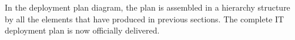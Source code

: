 In the deployment plan diagram, the plan is assembled in a hierarchy structure by all the elements that have produced in previous sections. The complete IT deployment plan is now officially delivered.


